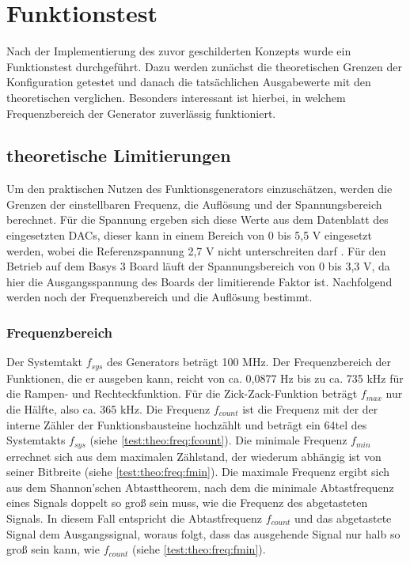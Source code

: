 \chapter{Funktionstest}
Nach der Implementierung des zuvor geschilderten Konzepts wurde ein Funktionstest durchgeführt.
Dazu werden zunächst die theoretischen Grenzen der Konfiguration getestet und danach die tatsächlichen Ausgabewerte mit den theoretischen verglichen.
Besonders interessant ist hierbei, in welchem Frequenzbereich der Generator zuverlässig funktioniert.

\section{theoretische Limitierungen}
Um den praktischen Nutzen des Funktionsgenerators einzuschätzen, werden die Grenzen der einstellbaren Frequenz, die Auflösung und der Spannungsbereich berechnet.
Für die Spannung ergeben sich diese Werte aus dem Datenblatt des eingesetzten DACs, dieser kann in einem Bereich von 0 bis 5,5 V eingesetzt werden, wobei die Referenzspannung 2,7 V nicht unterschreiten darf \cite{PmodDA2}.
Für den Betrieb auf dem Basys 3 Board läuft der Spannungsbereich von 0 bis 3,3 V, da hier die Ausgangsspannung des Boards der limitierende Faktor ist.
Nachfolgend werden noch der Frequenzbereich und die Auflösung bestimmt.

\subsection{Frequenzbereich}
Der Systemtakt $f_{sys}$ des Generators beträgt 100 MHz.
Der Frequenzbereich der Funktionen, die er ausgeben kann, reicht von ca. 0,0877 Hz bis zu ca. 735 kHz für die Rampen- und Rechteckfunktion.
Für die Zick-Zack-Funktion beträgt $f_{max}$ nur die Hälfte, also ca. 365 kHz.
Die Frequenz $f_{count}$ ist die Frequenz mit der der interne Zähler der Funktionsbausteine hochzählt und beträgt ein 64tel des Systemtakts $f_{sys}$ (siehe \cref{test:theo:freq:fcount}).
Die minimale Frequenz $f_{min}$ errechnet sich aus dem maximalen Zählstand, der wiederum abhängig ist von seiner Bitbreite  (siehe \cref{test:theo:freq:fmin}).
Die maximale Frequenz ergibt sich aus dem Shannon'schen Abtasttheorem, nach dem die minimale Abtastfrequenz eines Signals doppelt so groß sein muss, wie die Frequenz des abgetasteten Signals.
In diesem Fall entspricht die Abtastfrequenz $f_{count}$ und das abgetastete Signal dem Ausgangssignal, woraus folgt, dass das ausgehende Signal nur halb so groß sein kann, wie $f_{count}$ (siehe \cref{test:theo:freq:fmin}).

